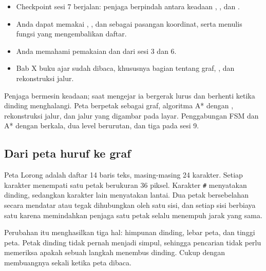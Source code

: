 
\begin{prasyaratbox}
\begin{itemize}[leftmargin=1.4em, itemsep=0.25em]
  \item Checkpoint sesi 7 berjalan: penjaga berpindah antara keadaan
        , , dan .
  \item Anda dapat memakai , , dan  sebagai
        pasangan koordinat, serta menulis fungsi yang mengembalikan daftar.
  \item Anda memahami pemakaian  dan 
        dari sesi 3 dan 6.
  \item Bab X buku ajar sudah dibaca, khususnya bagian tentang graf,
        , dan rekonstruksi jalur.
\end{itemize}
\end{prasyaratbox}


\petasesi
  {Penjaga bermesin keadaan; saat mengejar ia bergerak lurus dan berhenti
   ketika dinding menghalangi.}
  {Peta berpetak sebagai graf, algoritma A* dengan
   , rekonstruksi jalur, dan jalur yang digambar
   pada layar.}
  {Penggabungan FSM dan A* dengan  berkala, dua level
   berurutan, dan tiga  pada sesi 9.}


\subsection*{Dari peta huruf ke graf}

Peta Lorong adalah daftar 14 baris teks, masing-masing 24 karakter. Setiap
karakter menempati satu petak berukuran 36 piksel. Karakter \texttt{\#}
menyatakan dinding, sedangkan karakter lain menyatakan lantai. Dua petak
bersebelahan secara mendatar atau tegak dihubungkan oleh satu sisi, dan
setiap sisi berbiaya satu karena memindahkan penjaga satu petak selalu
menempuh jarak yang sama.

Perubahan itu menghasilkan tiga hal: himpunan dinding, lebar peta, dan
tinggi peta. Petak dinding tidak pernah menjadi simpul, sehingga pencarian
tidak perlu memeriksa apakah sebuah langkah menembus dinding. Cukup dengan
membuangnya sekali ketika peta dibaca.

